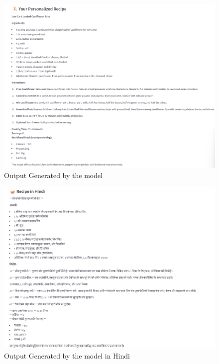 \documentclass[letterpaper,11pt]{report}
\begin{document}
\newpage
\begin{figure}[h]
    \centering
    \includegraphics[width=\linewidth]{English generation.png}
    \caption{Output Generated by the model}
    \label{fig: Output Generated}
\end{figure}
\newpage
\begin{figure}[h]
    \centering
    \includegraphics[width=\linewidth]{Hindi result.png}
    \caption{Output Generated by the model in Hindi}
    \label{fig: Output Generated}
\end{figure}
\newpage
\end{document}
